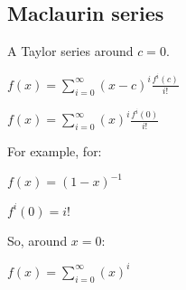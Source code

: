 
\subsection{Maclaurin series}

A Taylor series around \(c=0\).

$f(x)=\sum_{i=0}^\infty (x-c)^i \frac{f^i(c)}{i!}$

$f(x)=\sum_{i=0}^\infty (x)^i \frac{f^i(0)}{i!}$

For example, for:	   

$f(x)=(1-x)^{-1}$

$f^i(0)=i!$

So, around \(x=0\):

$f(x)=\sum_{i=0}^\infty (x)^i$

